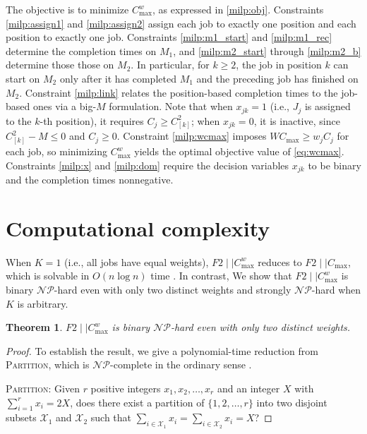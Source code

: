 \documentclass[12pt]{article} \textheight=24.5cm \textwidth=16.5cm \parskip = 0.165cm
\newtheorem{theorem}{Theorem}[section]
\let\origsection\section
\renewcommand{\section}{\FloatBarrier\origsection}
\begin{document}
\begin{sloppypar}
        The objective is to minimize $C_{\max}^w$, as expressed in \cref{milp:obj}.
        Constraints \cref{milp:assign1} and \cref{milp:assign2} assign each job to exactly one position and each position to exactly one job.
        Constraints \cref{milp:m1_start} and \cref{milp:m1_rec} determine the completion times on $M_1$, and \cref{milp:m2_start} through \cref{milp:m2_b} determine those those on $M_2$.
        In particular, for $k \geq 2$, the job in position $k$ can start on $M_2$ only after it has completed $M_1$ and the preceding job has finished on $M_2$.
        Constraint \cref{milp:link} relates the position-based completion times to the job-based ones via a big-$M$ formulation.
        Note that when $x_{jk} = 1$ (i.e., $J_j$ is assigned to the $k$-th position), it requires $C_j \geq C_{[k]}^2$; when $x_{jk} = 0$, it is inactive, since $C_{[k]}^2 - M \leq 0$ and $C_j \geq 0$.
        Constraint \cref{milp:wcmax} imposes  $W C_{\max} \geq w_j C_j$ for each job, so minimizing $C_{\max}^w$ yields the optimal objective value of \cref{eq:wcmax}.
        Constraints \cref{milp:x} and \cref{milp:dom} require the decision variables $x_{jk}$ to be binary and the completion times nonnegative.
        
        \section{Computational complexity} \label{sec:complexity}
        
        When $K=1$ (i.e., all jobs have equal weights), $F2 \mid \mid C_{\max}^w$ reduces to $F2 \mid \mid C_{\max}$, which is solvable in $O(n \log n)$ time \citep{Johnson1954NRL}.
        In contrast, We show that $F2 \mid \mid C_{\max}^w$ is binary $\mathcal{NP}$-hard even with only two distinct weights and strongly $\mathcal{NP}$-hard when $K$ is arbitrary.
        
        \begin{theorem}\label{thm:nphard}
            $F2 \mid \mid C_{\max}^w$ is binary $\mathcal{NP}$-hard even with only two distinct weights.
        \end{theorem}
        \begin{proof}
            To establish the result, we give a polynomial-time reduction from \textsc{Partition}, which is $\mathcal{NP}$-complete in the ordinary sense \citep{GareyJohnson1979computer}.
            
            \textsc{Partition}: Given $r$ positive integers $x_1, x_2, \ldots, x_r$ and an integer $X$ with $\sum_{i=1}^{r}x_i=2X$, does there exist a partition of $\{1, 2, \ldots, r\}$ into two disjoint subsets $\mathcal{X}_1$ and $\mathcal{X}_2$ such that $\sum_{i \in \mathcal{X}_1} x_i=\sum_{i\in \mathcal{X}_2} x_i=X$?
            

\end{proof}
\end{sloppypar}
\end{document}
